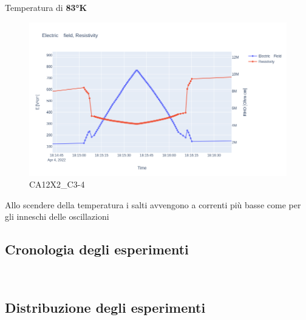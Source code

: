 \documentclass[11pt]{article}
\begin{document}
Temperatura di \textbf{83°K}

\begin{figure}
\centering
\includegraphics{CA12X2_C3-83.png}
\caption{CA12X2\_C3-4}
\end{figure}

Allo scendere della temperatura i salti avvengono a correnti più basse
come per gli inneschi delle oscillazioni

    \hypertarget{cronologia-degli-esperimenti}{%
\subsection{Cronologia degli
esperimenti}\label{cronologia-degli-esperimenti}}



    
    
    \begin{center}
    \end{center}
    { \hspace*{\fill} \\}
    
    \hypertarget{distribuzione-degli-esperimenti}{%
\subsection{Distribuzione degli
esperimenti}\label{distribuzione-degli-esperimenti}}


    \begin{center}
    \end{center}
    { \hspace*{\fill} \\}
    
\end{document}
